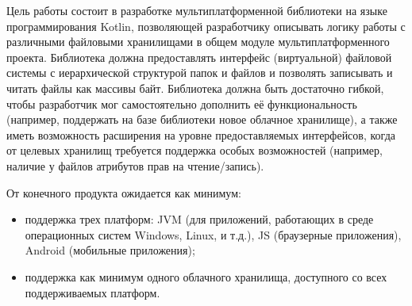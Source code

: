 
Цель работы состоит в разработке мультиплатформенной библиотеки на языке программирования Kotlin, позволяющей разработчику описывать логику работы с различными файловыми хранилищами в общем модуле мультиплатформенного проекта. Библиотека должна предоставлять интерфейс (виртуальной) файловой системы с иерархической структурой папок и файлов и позволять записывать и читать файлы как массивы байт. Библиотека должна быть достаточно гибкой, чтобы разработчик мог самостоятельно дополнить её функциональность (например, поддержать на базе библиотеки новое облачное хранилище), а также иметь возможность расширения на уровне предоставляемых интерфейсов, когда от целевых хранилищ требуется поддержка особых возможностей (например, наличие у файлов атрибутов прав на чтение/запись). 

От конечного продукта ожидается как минимум:
\begin{itemize}
    \item поддержка трех платформ: JVM (для приложений, работающих в среде операционных систем Windows, Linux, и т.д.), JS (браузерные приложения), Android (мобильные приложения);
    \item поддержка как минимум одного облачного хранилища, доступного со всех поддерживаемых платформ.
\end{itemize}


